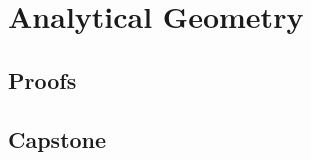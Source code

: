 \chapter{Analytical Geometry}
\label{chap:analytical-geometry}




\LRAExcludeFromPrintEditionBegin
\section*{Proofs}


\section*{Capstone}

\LRAExcludeFromPrintEditionEnd